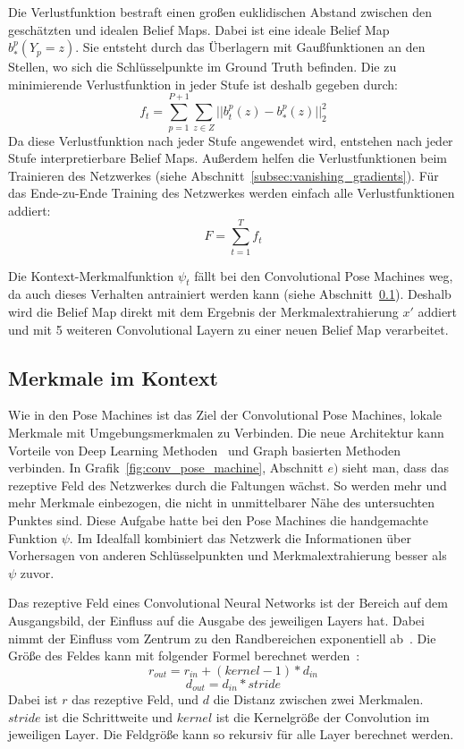 \documentclass[journal, a4paper]{IEEEtran}
\begin{document}
        Die Verlustfunktion bestraft einen großen euklidischen Abstand zwischen den geschätzten und idealen Belief Maps. Dabei ist eine ideale Belief Map $b_{*}^{p}(Y_p = z)$. Sie entsteht durch das Überlagern mit Gaußfunktionen an den Stellen, wo sich die Schlüsselpunkte im Ground Truth befinden. %
        Die zu minimierende Verlustfunktion in jeder Stufe ist deshalb gegeben durch:
        \[ f_t = \sum_{p=1}^{P+1} \sum_{z \in Z} ||b_{t}^{p}(z) - b_{*}^{p}(z) ||_{2}^{2}\]
        Da diese Verlustfunktion nach jeder Stufe angewendet wird, entstehen nach jeder Stufe interpretierbare Belief Maps. Außerdem helfen die Verlustfunktionen beim Trainieren des Netzwerkes (siehe Abschnitt~\ref{subsec:vanishing_gradients}). Für das Ende-zu-Ende Training des Netzwerkes werden einfach alle Verlustfunktionen addiert:
        \[ F = \sum_{t=1}^{T} f_t \]


        Die Kontext-Merkmalfunktion $\psi_t$ fällt bei den Convolutional Pose Machines weg, da auch dieses Verhalten antrainiert werden kann (siehe Abschnitt~\ref{subsec:kontext}). Deshalb wird die Belief Map direkt mit dem Ergebnis der Merkmalextrahierung $x'$ addiert und mit 5 weiteren Convolutional Layern zu einer neuen Belief Map verarbeitet. 

\subsection{Merkmale im Kontext}\label{subsec:kontext}
        Wie in den Pose Machines ist das Ziel der Convolutional Pose Machines, lokale Merkmale mit Umgebungsmerkmalen zu Verbinden. Die neue Architektur kann Vorteile von Deep Learning Methoden~\cite{toshev2014deeppose} und Graph basierten Methoden~\cite{andriluka2009pictorial,LanWM11} verbinden. %
        In Grafik~\ref{fig:conv_pose_machine}, Abschnitt $e)$ sieht man, dass das rezeptive Feld des Netzwerkes durch die Faltungen wächst. So werden mehr und mehr Merkmale einbezogen, die nicht in unmittelbarer Nähe des untersuchten Punktes sind. Diese Aufgabe hatte bei den Pose Machines die handgemachte Funktion $\psi$. Im Idealfall kombiniert das Netzwerk die Informationen über Vorhersagen von anderen Schlüsselpunkten und Merkmalextrahierung besser als $\psi$ zuvor.

        Das rezeptive Feld eines Convolutional Neural Networks ist der Bereich auf dem Ausgangsbild, der Einfluss auf die Ausgabe des jeweiligen Layers hat. Dabei nimmt der Einfluss vom Zentrum zu den Randbereichen exponentiell ab~\cite{dumoulin2016guide}. 
        Die Größe des Feldes kann mit folgender Formel berechnet werden~\cite{dumoulin2016guide}:
        \[ r_{out} = r_{in} + (kernel-1) * d_{in}\]
        \[ d_{out} = d_{in} * stride\]
        Dabei ist $r$ das rezeptive Feld, und $d$ die Distanz zwischen zwei Merkmalen. $stride$ ist die Schrittweite und $kernel$ ist die Kernelgröße der Convolution im jeweiligen Layer. Die Feldgröße kann so rekursiv für alle Layer berechnet werden.
        
\end{document}

